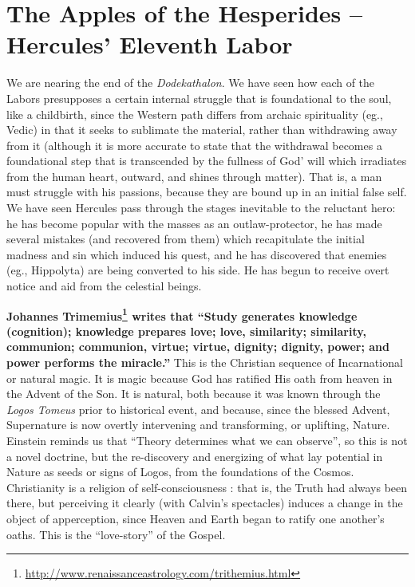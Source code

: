 \section{The Apples of the Hesperides – Hercules’ Eleventh Labor}

We are nearing the end of the \emph{Dodekathalon}. We have seen how each of the Labors presupposes a certain internal struggle that is foundational to the soul, like a childbirth, since the Western path differs from archaic spirituality (eg., Vedic) in that it seeks to sublimate the material, rather than withdrawing away from it (although it is more accurate to state that the withdrawal becomes a foundational step that is transcended by the fullness of God' will which irradiates from the human heart, outward, and shines through matter). That is, a man must struggle with his passions, because they are bound up in an initial false self. We have seen Hercules pass through the stages inevitable to the reluctant hero: he has become popular with the masses as an outlaw-protector, he has made several mistakes (and recovered from them) which recapitulate the initial madness and sin which induced his quest, and he has discovered that enemies (eg., Hippolyta) are being converted to his side. He has begun to receive overt notice and aid from the celestial beings.

\textbf{Johannes Trimemius\footnote{\url{http://www.renaissanceastrology.com/trithemius.html}} writes that ``Study generates knowledge (cognition); knowledge prepares love; love, similarity; similarity, communion; communion, virtue; virtue, dignity; dignity, power; and power performs the miracle.''} This is the Christian sequence of Incarnational or natural magic. It is magic because God has ratified His oath from heaven in the Advent of the Son. It is natural, both because it was known through the \emph{Logos Tomeus} prior to historical event, and because, since the blessed Advent, Supernature is now overtly intervening and transforming, or uplifting, Nature. Einstein reminds us that ``Theory determines what we can observe'', so this is not a novel doctrine, but the re-discovery and energizing of what lay potential in Nature as seeds or signs of Logos, from the foundations of the Cosmos. Christianity is a religion of self-consciousness : that is, the Truth had always been there, but perceiving it clearly (with Calvin's spectacles) induces a change in the object of apperception, since Heaven and Earth began to ratify one another's oaths. This is the ``love-story'' of the Gospel.

